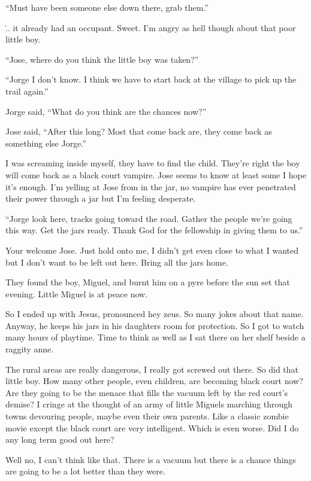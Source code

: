 ``Must have been someone else down there, grab them.''

\... it already had an occupant. Sweet. I'm angry as hell though about that poor little boy.

``Jose, where do you think the little boy was taken?''

``Jorge I don't know. I think we have to start back at the village to pick up the trail again.''

Jorge said, ``What do you think are the chances now?''

Jose said, ``After this long? Most that come back are, they come back as something else Jorge.''

I was screaming inside myself, they have to find the child. They're right the boy will come back as a black court vampire. Jose seems to know at least some I hope it's enough. I'm yelling at Jose from in the jar, no vampire has ever penetrated their power through a jar but I'm feeling desperate.

``Jorge look here, tracks going toward the road. Gather the people we're going this way. Get the jars ready. Thank God for the fellowship in giving them to us.''

Your welcome Jose. Just hold onto me, I didn't get even close to what I wanted but I don't want to be left out here. Bring all the jars home.

They found the boy, Miguel, and burnt him on a pyre before the sun set that evening. Little Miguel is at peace now.

So I ended up with Jesus, pronounced hey zeus. So many jokes about that name. Anyway, he keeps his jars in his daughters room for protection. So I got to watch many hours of playtime. Time to think as well as I sat there on her shelf beside a raggity anne.

The rural areas are really dangerous, I really got screwed out there. So did that little boy. How many other people, even children, are becoming black court now? Are they going to be the menace that fills the vacuum left by the red court's demise? I cringe at the thought of an army of little Miguels marching through towns devouring people, maybe even their own parents. Like a classic zombie movie except the black court are very intelligent. Which is even worse. Did I do any long term good out here?

Well no, I can't think like that. There is a vacuum but there is a chance things are going to be a lot better than they were.



